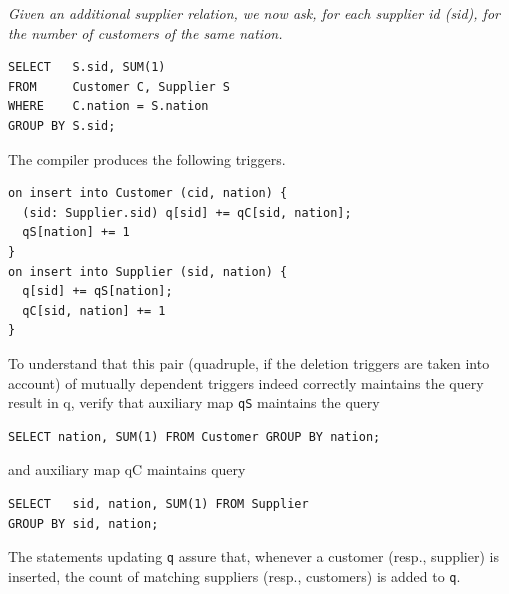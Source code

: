 \begin{example}\em
\label{ex:nation}
Given an additional supplier relation, we now ask, for each supplier id (sid),
for the number of customers of the same nation.
\begin{verbatim}
SELECT   S.sid, SUM(1)
FROM     Customer C, Supplier S
WHERE    C.nation = S.nation
GROUP BY S.sid;
\end{verbatim}
The compiler produces the following triggers.
\begin{verbatim}
on insert into Customer (cid, nation) {
  (sid: Supplier.sid) q[sid] += qC[sid, nation];
  qS[nation] += 1
}
on insert into Supplier (sid, nation) {
  q[sid] += qS[nation];
  qC[sid, nation] += 1
}
\end{verbatim}
To understand that this pair
(quadruple, if the deletion triggers are taken into account) of
mutually dependent triggers indeed correctly maintains the query result in q,
verify that auxiliary map {\tt qS} maintains the query
\begin{verbatim}
SELECT nation, SUM(1) FROM Customer GROUP BY nation;
\end{verbatim}
and auxiliary map qC maintains query
\begin{verbatim}
SELECT   sid, nation, SUM(1) FROM Supplier
GROUP BY sid, nation;
\end{verbatim}
The statements updating {\tt q} assure that,
whenever a customer (resp., supplier) is inserted, the count of
matching suppliers (resp., customers) is added to {\tt q}.
\punto
\end{example}


